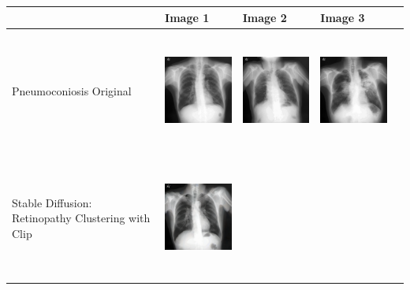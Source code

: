 
\begin{table}[H]
\centering
\begin{tabularx}{\linewidth}{@{}>{\centering\arraybackslash}m{3cm}>{\centering\arraybackslash}X>{\centering\arraybackslash}X>{\centering\arraybackslash}X>{\centering\arraybackslash}X@{}}
\toprule
 & Image 1 & Image 2 & Image 3 \\
\midrule
Pneumoconiosis Original &
\includegraphics[valign=M,width=\linewidth,height=4cm,keepaspectratio]{main/content/images/dataset_comparison/pneumoconiosis/1.jpg} & 
\includegraphics[valign=M,width=\linewidth,height=4cm,keepaspectratio]{main/content/images/dataset_comparison/pneumoconiosis/2.jpg} & 
\includegraphics[valign=M,width=\linewidth,height=4cm,keepaspectratio]{main/content/images/dataset_comparison/pneumoconiosis/3.jpg} \\
\midrule
Stable Diffusion: Retinopathy Clustering with Clip &
\includegraphics[valign=M,width=\linewidth,height=4cm,keepaspectratio]{main/content/images/sd_dreambooth/dreambooth_xl_v1/xray/xray_0.png} & 

\end{tabularx}
\end{table}
